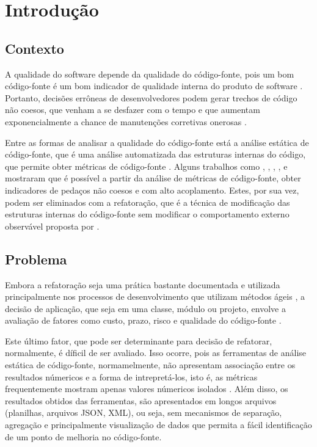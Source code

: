 \chapter{Introdução}


\section {Contexto}
A qualidade do software depende da qualidade do código-fonte, pois um bom código-fonte é um bom indicador de qualidade interna do produto de software \cite{beck2003test} \cite{ISO25023}. Portanto, decisões errôneas de desenvolvedores podem gerar trechos de código não coesos, que venham a se desfazer com o tempo e que aumentam exponencialmente a chance de manutenções corretivas onerosas \cite{beck2007implementation} \cite{beck1999}.


Entre as formas de analisar a qualidade do código-fonte está a análise estática de código-fonte, que é uma análise automatizada das estruturas internas do código, que permite obter métricas de código-fonte \cite{Emanuelsson2008} \cite{Wichmann95}  \cite{Nielson:1999} \cite{Sommerville10}. Alguns trabalhos como , , , ,  e  mostraram que é possível a partir da análise de métricas de código-fonte, obter indicadores de pedaços não coesos e com alto acoplamento. Estes, por sua vez, podem ser eliminados com a refatoração, que é a técnica de modificação das estruturas internas do código-fonte sem modificar o comportamento externo observável proposta por .


\section{Problema}


Embora a refatoração seja uma prática bastante documentada e utilizada principalmente nos processos de desenvolvimento que utilizam métodos ágeis \cite{beck1999}, a decisão de aplicação, que seja em uma classe, módulo ou projeto, envolve a avaliação de fatores como  custo, prazo, risco e qualidade do código-fonte \cite{yamashita2013assessing}.  

Este último fator, que pode ser determinante para decisão de refatorar, normalmente, é díficil de ser avaliado. Isso ocorre, pois as ferramentas de análise estática de código-fonte, normamelmente, não apresentam associação entre os resultados númericos e a forma de intrepretá-los, isto é, as métricas frequentemente mostram apenas valores númericos isolados \cite{Meirelles2013}. Além disso, os resultados obtidos das ferramentas, são apresentados em longos arquivos (planilhas, arquivos JSON, XML), ou seja, sem mecanismos de separação, agregação e principalmente visualização de dados que permita a fácil identificação de um ponto de melhoria no código-fonte.


